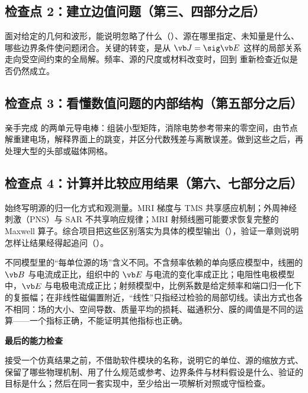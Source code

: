 \subsection*{检查点 2：建立边值问题（第三、四部分之后）}
面对给定的几何和波形，能说明忽略了什么（）、源在哪里指定、未知量是什么、哪些边界条件使问题闭合。关键的转变，是从 $\vb J=\sig\vb E$ 这样的局部关系走向受空间约束的全局解。频率、源的尺度或材料改变时，回到 重新检查近似是否仍然成立。

\subsection*{检查点 3：看懂数值问题的内部结构（第五部分之后）}
亲手完成 的两单元导电棒：组装小型矩阵，消除电势参考带来的零空间，由节点解重建电场，解释界面上的跳变，并区分代数残差与离散误差。做到这些之后，再处理大型的头部或磁体网格。

\subsection*{检查点 4：计算并比较应用结果（第六、七部分之后）}
始终写明源的归一化方式和观测量。MRI 梯度与 TMS 共享感应机制；外周神经刺激（PNS）与 SAR 不共享响应规律；MRI 射频线圈可能要求恢复完整的 Maxwell 算子。综合项目把这些区别落实为具体的模型输出（），验证一章则说明怎样让结果经得起追问（）。

\begin{pitfall}
不同模型里的“每单位源的场”含义不同。不含频率依赖的单向感应模型中，线圈的 $\vb B$ 与电流成正比，组织中的 $\vb E$ 与电流的变化率成正比；电阻性电极模型中，$\vb E$ 与电极电流成正比；射频模型中，比例系数是给定频率和端口归一化下的复振幅；在非线性磁偏置附近，“线性”只指经过检验的局部切线。读出方式也各不相同：场的大小、空间导数、质量平均的损耗、磁通积分、膜的阈值是不同的运算——一个指标正确，不能证明其他指标也正确。
\end{pitfall}

\begin{chapterguide}\begin{minipage}{\linewidth}
{\sffamily\bfseries\color{accent}最后的能力检查}\par\vspace{2pt}
接受一个仿真结果之前，不借助软件模块的名称，说明它的单位、源的缩放方式、保留了哪些物理机制、用了什么规范或参考、边界条件与材料假设是什么、验证的目标是什么；然后在同一套实现中，至少给出一项解析对照或守恒检查。
\end{minipage}\end{chapterguide}
